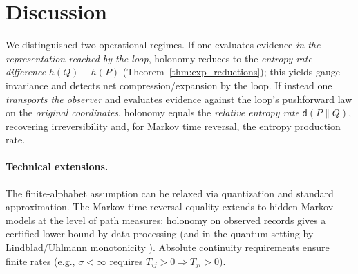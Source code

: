 \documentclass[11pt]{article}
\newcommand{\1}{\mathbbm{1}}
\begin{document}
\section*{Discussion}
We distinguished two operational regimes. If one evaluates evidence \emph{in the representation reached by the loop}, holonomy reduces to the \emph{entropy-rate difference} $h(Q)-h(P)$ (Theorem~\ref{thm:exp_reductions}); this yields gauge invariance and detects net compression/expansion by the loop. If instead one \emph{transports the observer} and evaluates evidence against the loop's pushforward law on the \emph{original coordinates}, holonomy equals the \emph{relative entropy rate} $\mathsf{d}(P\|Q)$, recovering irreversibility and, for Markov time reversal, the entropy production rate.

\paragraph{Technical extensions.} The finite-alphabet assumption can be relaxed via quantization and standard approximation. The Markov time-reversal equality extends to hidden Markov models at the level of path measures; holonomy on observed records gives a certified lower bound by data processing (and in the quantum setting by Lindblad/Uhlmann monotonicity \cite{lindblad1975,uhlmann1977}). Absolute continuity requirements ensure finite rates (e.g., $\sigma<\infty$ requires $T_{ij}>0 \Rightarrow T_{ji}>0$).
\end{document}
